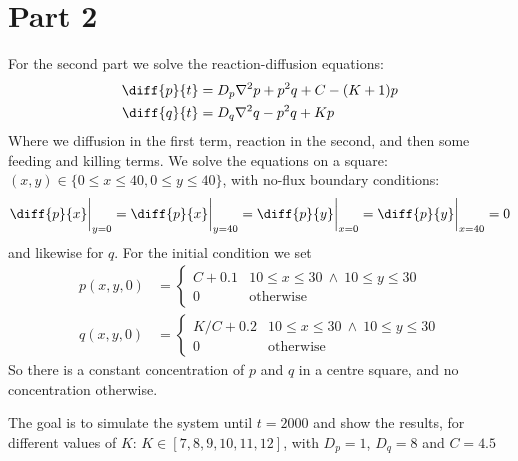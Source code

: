 \documentclass[a4paper,10pt]{article}
\begin{document}
	
	\newpage
	\section*{Part 2}
	For the second part we solve the reaction-diffusion equations:
	\begin{align}
		\diff{p}{t} &= D_p \nabla^2 p + p^2q+C-(K+1)p \\
		\diff{q}{t} &= D_q \nabla^2 q - p^2q+Kp
	\end{align}
	Where we diffusion in the first term, reaction in the second, and then some feeding and killing terms. We solve the equations on a square: $(x,y) \in \{0\leq x \leq 40, 0\leq y\leq 40\} $, with no-flux boundary conditions:
	\begin{equation}\label{key}
		\diff{p}{x}\bigg|_{y=0} = \diff{p}{x}\bigg|_{y=40} = \diff{p}{y}\bigg|_{x=0} = \diff{p}{y}\bigg|_{x=40} = 0
	\end{equation}
	and likewise for $ q $. For the initial condition we set
	\begin{align}\label{key}
		p(x,y,0) &= \begin{cases}
		C+0.1 & 10 \leq x \leq 30\  \wedge \ 10 \leq y \leq 30 \\
		0 & \text{otherwise}
		\end{cases} \\
		q(x,y,0) &= \begin{cases}
		K/C+0.2 & 10 \leq x \leq 30\  \wedge \ 10 \leq y \leq 30 \\
		0 & \text{otherwise}
		\end{cases}
	\end{align}
	So there is a constant concentration of $ p $ and $ q $ in a centre square, and no concentration otherwise.
	
	The goal is to simulate the system until $ t=2000 $ and show the results, for different values of $ K $: $ K \in [7,8,9,10,11,12] $, with $ D_p = 1 $, $ D_q=8 $ and $ C=4.5 $
	
\end{document}
